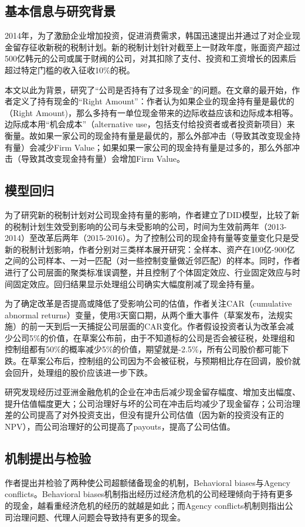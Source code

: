 \documentclass{article}
\begin{document}
\subsection{基本信息与研究背景}
\indent 2014年，为了激励企业增加投资，促进消费需求，韩国迅速提出并通过了对企业现金留存征收新税的税制计划。新的税制计划针对截至上一财政年度，账面资产超过500亿韩元的公司或属于财阀的公司，对其扣除了支付、投资和工资增长的因素后超过特定门槛的收入征收10\%的税。

\indent 本文以此为背景，研究了“公司是否持有了过多现金”的问题。在文章的最开始，作者定义了持有现金的“Right Amount”：作者认为如果企业的现金持有量是最优的（Right Amount)，那么多持有一单位现金带来的边际收益应该和边际成本相等。边际成本用“机会成本”（alternative use，包括支付给投资者或者投资新项目）来衡量。故如果一家公司的现金持有量是最优的，那么外部冲击（导致其改变现金持有量）会减少Firm Value；如果如果一家公司的现金持有量是过多的，那么外部冲击（导致其改变现金持有量）会增加Firm Value。

\subsection{模型回归}
\indent 为了研究新的税制计划对公司现金持有量的影响，作者建立了DID模型，比较了新的税制计划生效受到影响的公司与未受影响的公司，时间为生效前两年（2013-2014）至改革后两年（2015-2016）。为了控制公司的现金持有量等变量变化只是受新的税制计划影响，作者分别对三类样本展开研究：全样本、资产在100亿-900亿之间的公司样本、一对一匹配（对一些控制变量做近邻匹配）的样本。同时，作者进行了公司层面的聚类标准误调整，并且控制了个体固定效应、行业固定效应与时间固定效应。回归结果显示处理组公司确实大幅度削减了现金持有量。

\indent 为了确定改革是否提高或降低了受影响公司的估值，作者关注CAR（cumulative abnormal returns）变量，使用3天窗口期，从两个重大事件（草案发布，法规实施）的前一天到后一天捕捉公司层面的CAR变化。作者假设投资者认为改革会减少公司5\%的价值，在草案公布前，由于不知道标的公司是否会被征税，处理组和控制组都有50\%的概率减少5\%的价值，期望就是-2.5\%，所有公司股价都可能下跌。在草案公布后，控制组的公司因为不会被征税，与预期相比存在回调，股价就会回升，处理组的股价应该进一步下跌。

\indent 研究发现经历过亚洲金融危机的企业在冲击后减少现金留存幅度、增加支出幅度、提升估值幅度更大；公司治理好与坏的公司在冲击后均减少了现金留存；公司治理差的公司提高了对外投资支出，但没有提升公司估值（因为新的投资没有正的NPV），而公司治理好的公司提高了payouts，提高了公司估值。

\subsection{机制提出与检验}
\indent 作者提出并检验了两种使公司超额储备现金的机制，Behavioral biases与Agency conflicts。Behavioral biases机制指出经历过经济危机的公司经理倾向于持有更多的现金，越看重经济危机的经历的就越是如此；而Agency conflicts机制则指出公司治理问题、代理人问题会导致持有更多的现金。
\end{document}
